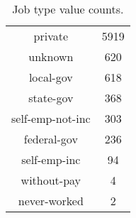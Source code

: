\begin{table}
    \caption{Job type value counts.}
    \label{tab:job_type_value_count}
    \centering
    \begin{tabular}{cc}
        private & 5919 \\
        unknown & 620 \\
        local-gov & 618 \\
        state-gov & 368 \\
        self-emp-not-inc & 303 \\
        federal-gov & 236 \\
        self-emp-inc & 94 \\
        without-pay & 4 \\
        never-worked & 2 \\
    \end{tabular}
\end{table}

